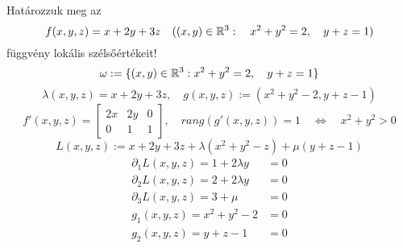 \documentclass[a4paper,11.5pt]{article}
\begin{document}
	\begin{task}
		Határozzuk meg az
		\[ f(x,y,z)=x+2y+3z\quad ((x,y)\in\mathbb{R}^3:\quad x^2+y^2=2,\quad y+z=1) \]
		függvény lokális szélsőértékeit!
		\[ \omega:=\{(x,y)\in\mathbb{R}^3: x^2+y^2=2,\quad y+z=1  \} \]
		\[ \lambda(x,y,z)=x+2y+3z ,\quad g(x,y,z):=(x^2+y^2-2,y+z-1) \]
		\[ f'(x,y,z)=\begin{bmatrix}
			2x&2y&0\\
			0&1&1
		\end{bmatrix},\quad rang(g'(x,y,z))=1\quad \Leftrightarrow\quad x^2+y^2>0 \]
		\[ L(x,y,z):=x+2y+3z+\lambda(x^2+y^2-z)+\mu(y+z-1) \]
		\begin{align*}
			\partial_1 L(x,y,z)=1+2\lambda y&=0\\
			\partial_2L(x,y,z)=2+2\lambda y&=0\\
			\partial_3L(x,y,z)=3+\mu&=0\\
			g_1(x,y,z)=x^2+y^2-2&=0\\
			g_2(x,y,z)=y+z-1&=0
		\end{align*}
	\end{task}
\end{document}
